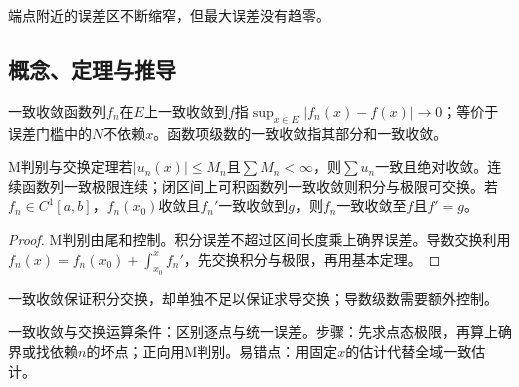 \begin{center}\par\small 端点附近的误差区不断缩窄，但最大误差没有趋零。
\end{center}

\subsection{概念、定理与推导}

\begin{definition}{一致收敛}函数列$f_n$在$E$上一致收敛到$f$指$\sup_{x\in E}|f_n(x)-f(x)|\to0$；等价于误差门槛中的$N$不依赖$x$。函数项级数的一致收敛指其部分和一致收敛。\end{definition}
\begin{theorem}{M判别与交换定理}若$|u_n(x)|\le M_n$且$\sum M_n<\infty$，则$\sum u_n$一致且绝对收敛。连续函数列一致极限连续；闭区间上可积函数列一致收敛则积分与极限可交换。若$f_n\in C^1[a,b]$，$f_n(x_0)$收敛且$f_n\prime$一致收敛到$g$，则$f_n$一致收敛至$f$且$f\prime=g$。\end{theorem}
\begin{proof}M判别由尾和控制。积分误差不超过区间长度乘上确界误差。导数交换利用$f_n(x)=f_n(x_0)+\int_{x_0}^xf_n\prime$，先交换积分与极限，再用基本定理。\end{proof}
一致收敛保证积分交换，却单独不足以保证求导交换；导数级数需要额外控制。

\begin{method}{一致收敛与交换运算}条件：区别逐点与统一误差。步骤：先求点态极限，再算上确界或找依赖$n$的坏点；正向用M判别。易错点：用固定$x$的估计代替全域一致估计。\end{method}
